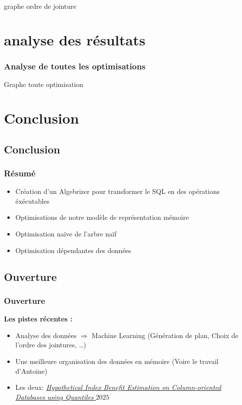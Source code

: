 \documentclass[aspectratio=43,12pt]{beamer}
\begin{document}
\begin{frame}
    graphe ordre de jointure
\end{frame}
\section{analyse des résultats}
\begin{frame}
    \frametitle{Analyse de toutes les optimisations}
    Graphe toute optimisation
\end{frame}
\section{Conclusion}
\subsection{Conclusion}
\begin{frame}
    \frametitle{Résumé}
    \begin{itemize}
        \item Création d'un Algebrizer pour transformer le SQL en des opérations éxécutables
        \item Optimisations de notre modèle de représentation mémoire
        \item Optimisation naïve de l'arbre naïf
        \item Optimisation dépendantes des données
    \end{itemize}
\end{frame}
\subsection{Ouverture}
\begin{frame}
    \frametitle{Ouverture}
    \textbf{Les pistes récentes :}
    \begin{itemize}
        \item Analyse des données \(\Rightarrow\) Machine Learning (Génération de plan, Choix de l'ordre des jointures, \dots)
        \item Une meilleure organisation des données en mémoire (Voire le travail d'Antoine)
        \item Les deux: \href{https://www.normalesup.org/~rouvroy/papers/NTU_25_QHICS.pdf}{\textit{Hypothetical Index Benefit Estimation on Column-oriented Databases using Quantiles} \(2025\)}

    \end{itemize}

\end{frame}
\end{document}
